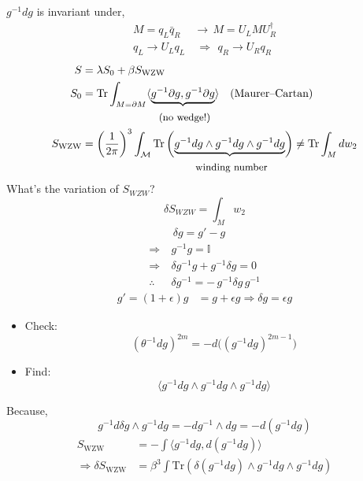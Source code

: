 \documentclass[14pt]{article} %
\begin{document}
$g^{-1} dg$ is invariant under,
\begin{align*}
M = q_L \bar{q}_R \,&\longrightarrow\, M = U_L M U_R^\dagger 
\\
q_L \to U_L q_L
  &~\Rightarrow\,~
q_R \to U_R q_R
\end{align*}
\begin{align*}
S &= \lambda S_0 + \beta S_{\text{WZW}}
\\
S_0 &= \text{Tr} \int_{M=\partial M}
\langle\underbrace{ g^{-1} \partial g , g^{-1} \partial g } \rangle
\quad \text{(Maurer--Cartan)}
\\
& \qquad \qquad \qquad ~~~ \small \text{(no wedge!)}
\\
S_{\text{WZW}}
&=
\left( \frac{1}{2\pi} \right)^3
\int_{\mathcal{M}}
\text{Tr}
\left(
\underbrace{g^{-1} dg \wedge g^{-1} dg \wedge g^{-1} dg}
\right) \neq \text{Tr} \int_M dw_2
\\
& \qquad \qquad \qquad \qquad \quad ~~~~ \small \text{winding number}
\end{align*}
What's the variation of $S_{WZW}$?
\[
\delta S_{WZW} = \int_M w_2
\]
\begin{align*}
& \,\delta g = g' - g
\\
\Rightarrow~ & g^{-1} g = \mathbb{I}
\\
\Rightarrow~ & \delta g^{-1}g + g^{-1} \delta g = 0
\\
\therefore~ & \delta g^{-1} = - \, g^{-1} \delta g \, g^{-1}
\end{align*}
\begin{align*}
g' = (1+ \epsilon)g & = g+ \epsilon g \Rightarrow \delta g = \epsilon g
\end{align*}
\begin{tcolorbox}
\begin{itemize}
\item Check:
\[
(\theta^{-1} dg)^{2m} = -d\big( (g^{-1}dg)^{2m-1} \big)
\]

\item Find:
\[
\langle g^{-1} dg \wedge g^{-1} dg \wedge g^{-1} dg \rangle
\]
\end{itemize}
\end{tcolorbox}

Because,
\[
g^{-1} d\delta g \wedge g^{-1} dg
=
- d g^{-1} \wedge dg
=
- d(g^{-1} dg)
\]
\begin{align*}
S_{\text{WZW}}
&=
- \int
\langle g^{-1} dg , d(g^{-1} dg) \rangle
\\
\Rightarrow
\delta S_{\text{WZW}}
&=
\beta^3 \int \text{Tr} \left( \delta (g^{-1} dg) \wedge g^{-1} dg
\wedge g^{-1} dg \right)
\end{align*}
\end{document}
